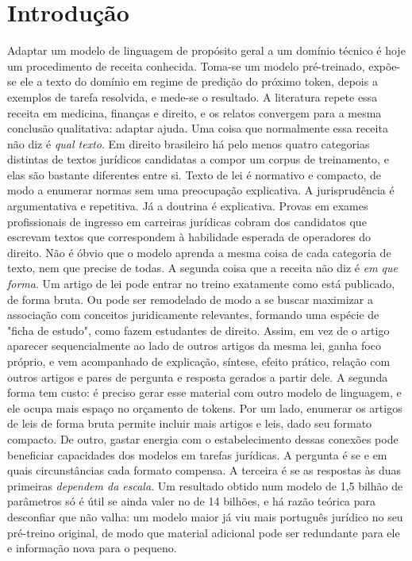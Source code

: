 \documentclass{IOS-Book-Article}
\begin{document}
\section{Introdução}
Adaptar um modelo de linguagem de propósito geral a um domínio técnico é hoje um procedimento de receita conhecida. Toma-se um modelo pré-treinado, expõe-se ele a texto do domínio em regime de predição do próximo token, depois a exemplos de tarefa resolvida, e mede-se o resultado. A literatura repete essa receita em medicina, finanças e direito, e os relatos convergem para a mesma conclusão qualitativa: adaptar ajuda.
Uma coisa que normalmente essa receita não diz é \emph{qual texto}. Em direito brasileiro há pelo menos quatro categorias distintas de textos jurídicos candidatas a compor um corpus de treinamento, e elas são bastante diferentes entre si. Texto de lei é normativo e compacto, de modo a enumerar normas sem uma preocupação explicativa. A jurisprudência é argumentativa e repetitiva. Já a doutrina é explicativa. Provas em exames profissionais de ingresso em carreiras jurídicas cobram dos candidatos que escrevam textos que correspondem à habilidade esperada de operadores do direito. Não é óbvio que o modelo aprenda a mesma coisa de cada categoria de texto, nem que precise de todas.
A segunda coisa que a receita não diz é \emph{em que forma}. Um artigo de lei pode entrar no treino exatamente como está publicado, de forma bruta. Ou pode ser remodelado de modo a se buscar maximizar a associação com conceitos juridicamente relevantes, formando uma espécie de "ficha de estudo", como fazem estudantes de direito. Assim, em vez de o artigo aparecer sequencialmente ao lado de outros artigos da mesma lei, ganha foco próprio, e vem acompanhado de explicação, síntese, efeito prático, relação com outros artigos e pares de pergunta e resposta gerados a partir dele. A segunda forma tem custo: é preciso gerar esse material com outro modelo de linguagem, e ele ocupa mais espaço no orçamento de tokens. Por um lado, enumerar os artigos de leis de forma bruta permite incluir mais artigos e leis, dado seu formato compacto. De outro, gastar energia com o estabelecimento dessas conexões pode beneficiar capacidades dos modelos em tarefas jurídicas. A pergunta é se e em quais circunstâncias cada formato compensa.
A terceira é se as respostas às duas primeiras \emph{dependem da escala}. Um resultado obtido num modelo de 1,5 bilhão de parâmetros só é útil se ainda valer no de 14 bilhões, e há razão teórica para desconfiar que não valha: um modelo maior já viu mais português jurídico no seu pré-treino original, de modo que material adicional pode ser redundante para ele e informação nova para o pequeno.
\end{document}

